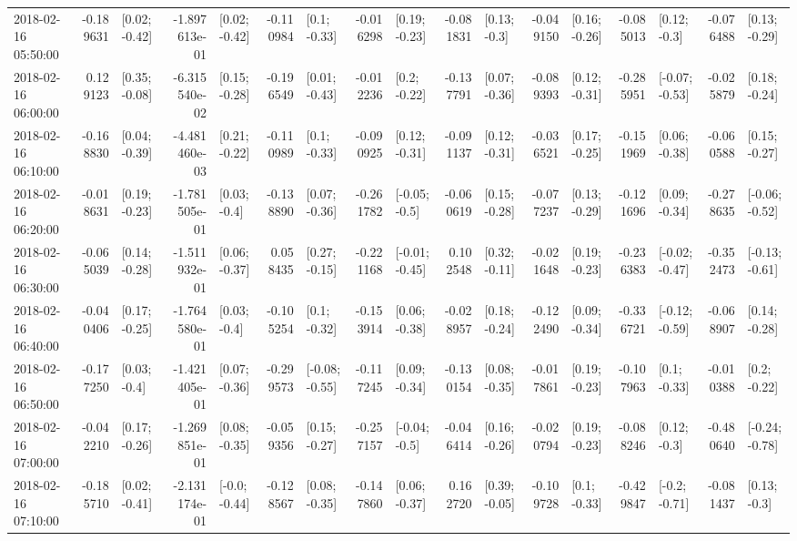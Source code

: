 \begin{tabular}{lrlrlrlrlrlrlrlrl}
2018-02-16 05:50:00 & -0.189631 &   [0.02; -0.42] & -1.897613e-01 &   [0.02; -0.42] & -0.110984 &    [0.1; -0.33] & -0.016298 &   [0.19; -0.23] & -0.081831 &    [0.13; -0.3] & -0.049150 &   [0.16; -0.26] & -0.085013 &    [0.12; -0.3] & -0.076488 &   [0.13; -0.29] \\
2018-02-16 06:00:00 &  0.129123 &   [0.35; -0.08] & -6.315540e-02 &   [0.15; -0.28] & -0.196549 &   [0.01; -0.43] & -0.012236 &    [0.2; -0.22] & -0.137791 &   [0.07; -0.36] & -0.089393 &   [0.12; -0.31] & -0.285951 &  [-0.07; -0.53] & -0.025879 &   [0.18; -0.24] \\
2018-02-16 06:10:00 & -0.168830 &   [0.04; -0.39] & -4.481460e-03 &   [0.21; -0.22] & -0.110989 &    [0.1; -0.33] & -0.090925 &   [0.12; -0.31] & -0.091137 &   [0.12; -0.31] & -0.036521 &   [0.17; -0.25] & -0.151969 &   [0.06; -0.38] & -0.060588 &   [0.15; -0.27] \\
2018-02-16 06:20:00 & -0.018631 &   [0.19; -0.23] & -1.781505e-01 &    [0.03; -0.4] & -0.138890 &   [0.07; -0.36] & -0.261782 &   [-0.05; -0.5] & -0.060619 &   [0.15; -0.28] & -0.077237 &   [0.13; -0.29] & -0.121696 &   [0.09; -0.34] & -0.278635 &  [-0.06; -0.52] \\
2018-02-16 06:30:00 & -0.065039 &   [0.14; -0.28] & -1.511932e-01 &   [0.06; -0.37] &  0.058435 &   [0.27; -0.15] & -0.221168 &  [-0.01; -0.45] &  0.102548 &   [0.32; -0.11] & -0.021648 &   [0.19; -0.23] & -0.236383 &  [-0.02; -0.47] & -0.352473 &  [-0.13; -0.61] \\
2018-02-16 06:40:00 & -0.040406 &   [0.17; -0.25] & -1.764580e-01 &    [0.03; -0.4] & -0.105254 &    [0.1; -0.32] & -0.153914 &   [0.06; -0.38] & -0.028957 &   [0.18; -0.24] & -0.122490 &   [0.09; -0.34] & -0.336721 &  [-0.12; -0.59] & -0.068907 &   [0.14; -0.28] \\
2018-02-16 06:50:00 & -0.177250 &    [0.03; -0.4] & -1.421405e-01 &   [0.07; -0.36] & -0.299573 &  [-0.08; -0.55] & -0.117245 &   [0.09; -0.34] & -0.130154 &   [0.08; -0.35] & -0.017861 &   [0.19; -0.23] & -0.107963 &    [0.1; -0.33] & -0.010388 &    [0.2; -0.22] \\
2018-02-16 07:00:00 & -0.042210 &   [0.17; -0.26] & -1.269851e-01 &   [0.08; -0.35] & -0.059356 &   [0.15; -0.27] & -0.257157 &   [-0.04; -0.5] & -0.046414 &   [0.16; -0.26] & -0.020794 &   [0.19; -0.23] & -0.088246 &    [0.12; -0.3] & -0.480640 &  [-0.24; -0.78] \\
2018-02-16 07:10:00 & -0.185710 &   [0.02; -0.41] & -2.131174e-01 &   [-0.0; -0.44] & -0.128567 &   [0.08; -0.35] & -0.147860 &   [0.06; -0.37] &  0.162720 &   [0.39; -0.05] & -0.109728 &    [0.1; -0.33] & -0.429847 &   [-0.2; -0.71] & -0.081437 &    [0.13; -0.3] \\

\end{tabular}
